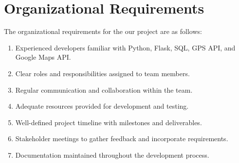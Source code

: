 \documentclass{BusMateSRS}
\begin{document}
\section{Organizational Requirements}
The organizational requirements for the our project are as follows:

\begin{enumerate}
	\item Experienced developers familiar with Python, Flask, SQL,
	      GPS API, and Google Maps API.
	\item Clear roles and responsibilities assigned to team members.
	\item Regular communication and collaboration within the team.
	\item Adequate resources provided for development and testing.
	\item Well-defined project timeline with milestones and deliverables.
	\item Stakeholder meetings to gather feedback and incorporate requirements.
	\item Documentation maintained throughout the development process.
\end{enumerate}


\end{document}
